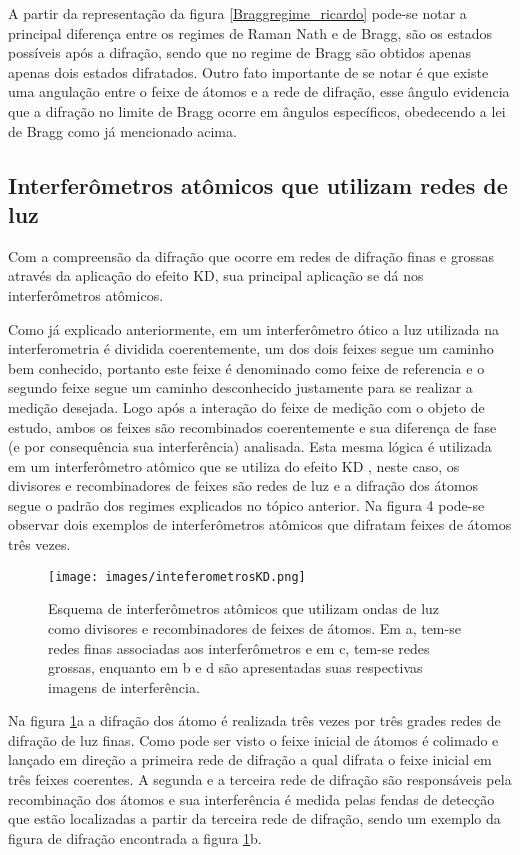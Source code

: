 			\par A partir da representação da figura \ref{Braggregime_ricardo} pode-se notar a principal diferença entre os regimes de Raman Nath e de Bragg, são os estados possíveis após a difração, sendo que no regime de Bragg são obtidos apenas apenas dois estados difratados. Outro fato importante de se notar é que existe uma angulação entre o feixe de átomos e a rede de difração, esse ângulo evidencia que a difração no limite de Bragg ocorre em ângulos específicos, obedecendo a lei de Bragg como já mencionado acima.

\subsection{Interferômetros atômicos que utilizam redes de luz}
	\par Com a compreensão da difração que ocorre em redes de difração finas e grossas através da aplicação do efeito KD, sua principal aplicação se dá nos interferômetros atômicos.
	
	\par Como já explicado anteriormente, em um interferômetro ótico a luz utilizada na interferometria é dividida coerentemente, um dos dois feixes segue um caminho bem conhecido, portanto este feixe é denominado como feixe de referencia e o segundo feixe segue um caminho desconhecido justamente para se realizar a medição desejada. Logo após a interação do feixe de medição com o objeto de estudo, ambos os feixes são recombinados coerentemente e sua diferença de fase (e por consequência sua interferência) analisada. Esta mesma lógica é utilizada em um interferômetro atômico que se utiliza do efeito KD , neste caso, os divisores e recombinadores de feixes são redes de luz e a difração dos átomos  segue o padrão dos regimes explicados no tópico anterior. Na figura 4 pode-se observar dois exemplos de interferômetros atômicos que difratam  feixes de átomos três vezes.

	\begin{figure}[h!]
      \caption{Esquema de interferômetros atômicos que utilizam ondas de luz como divisores e recombinadores de feixes de átomos. Em a, tem-se redes finas associadas aos interferômetros e em c, tem-se redes grossas, enquanto em b e d são apresentadas suas respectivas imagens de interferência.}
      \centering
      \texttt{[image: images/inteferometrosKD.png]}
      \label{inteferometrosKD_ricardo}
	\end{figure}

	\par Na figura \ref{inteferometrosKD_ricardo}a  a difração dos átomo é realizada três vezes por três grades redes de difração de luz finas. Como pode ser visto o feixe inicial de átomos é colimado e lançado em direção a primeira rede de difração a qual difrata o feixe inicial em três feixes coerentes. A segunda e a terceira rede de difração são responsáveis pela recombinação dos átomos e sua interferência é medida pelas fendas de detecção que estão localizadas a partir da terceira rede de difração, sendo um exemplo da figura de difração encontrada a figura \ref{inteferometrosKD_ricardo}b.
	
